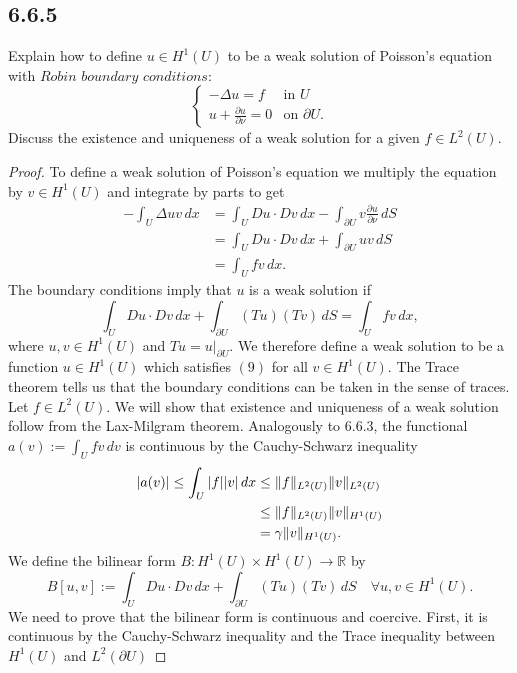 \documentclass{article}
\DeclarePairedDelimiter{\norm}{\lVert}{\rVert}
\begin{document}
\begin{flushleft}
\subsection{\textbf{6.6.5}} Explain how to define $u\in H^1(U)$ to be a weak solution of Poisson's equation with $\textit{Robin boundary conditions}:$
\[
  \begin{cases} 
      -\Delta u=f & \text{in $U$} \\
      u+\frac{\partial u}{\partial \nu}=0 & \text{on $\partial U$}. 
   \end{cases}
\]
Discuss the existence and uniqueness of a weak solution for a given $f\in L^2(U)$.
\begin{proof}
To define a weak solution of Poisson's equation we multiply the equation by $v\in H^1(U)$ and integrate by parts to get
\begin{align*}
-\int_U \Delta u v \,dx &= \int_U D u \cdot D v \,dx - \int_{\partial U} v \frac{\partial u}{\partial \nu}\,dS \\&=
\int_U D u \cdot D v \,dx + \int_{\partial U} uv\,dS \\&=
\int_U fv\,dx.
\end{align*}
The boundary conditions imply that $u$ is a weak solution if
\begin{equation}
    \int_U D u \cdot D v \,dx + \int_{\partial U} (Tu)(Tv)\,dS = \int_U fv\,dx,
\end{equation}
where $u,v\in H^1(U)$ and $Tu=u|_{\partial U}$. We therefore define a weak solution to be a function $u\in H^1(U)$ which satisfies $(9)$ for all $v\in H^1(U)$. The Trace theorem tells us that the boundary conditions can be taken in the sense of traces.
\\
\bigskip
Let $f\in L^2(U)$. We will show that existence and uniqueness of a weak solution follow from the Lax-Milgram theorem. Analogously to $6.6.3$, the functional $a(v):=\int_U fv\,dv$ is continuous by the Cauchy-Schwarz inequality
\begin{align*}|a(v)| \le \int_U |f||v|\,dx &\le \norm{f}_{L^2(U)}\norm{v}_{L^2(U)} \\&\le \norm{f}_{L^2(U)}\norm{v}_{H^1(U)}\\&=\gamma \norm{v}_{H^1(U)}.
\end{align*}
We define the bilinear form $B:H^1(U)\times H^1(U)\to\mathbb R$ by
$$B[u,v]:=\int_U Du\cdot Dv\,dx +\int_{\partial U}(Tu)(Tv)\,dS\quad \forall u,v\in H^1(U).$$
We need to prove that the bilinear form is continuous and coercive. First, it is continuous by the  Cauchy-Schwarz inequality and the Trace inequality between $H^1(U)$ and $L^2(\partial U)$

\end{proof}
\end{flushleft}
\end{document}
